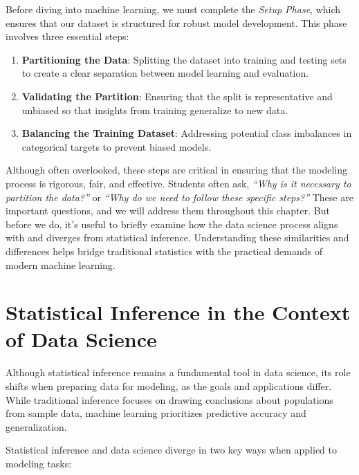 \documentclass[
]{book}
\providecommand{\tightlist}{%
  \setlength{\itemsep}{0pt}\setlength{\parskip}{0pt}}
\theoremstyle{definition}
\theoremstyle{definition}
\theoremstyle{definition}
\theoremstyle{definition}
\theoremstyle{remark}
\begin{document}
Before diving into machine learning, we must complete the \emph{Setup Phase}, which ensures that our dataset is structured for robust model development. This phase involves three essential steps:

\begin{enumerate}
\def\labelenumi{\arabic{enumi}.}
\tightlist
\item
  \textbf{Partitioning the Data}: Splitting the dataset into training and testing sets to create a clear separation between model learning and evaluation.\\
\item
  \textbf{Validating the Partition}: Ensuring that the split is representative and unbiased so that insights from training generalize to new data.\\
\item
  \textbf{Balancing the Training Dataset}: Addressing potential class imbalances in categorical targets to prevent biased models.
\end{enumerate}

Although often overlooked, these steps are critical in ensuring that the modeling process is rigorous, fair, and effective. Students often ask, \emph{``Why is it necessary to partition the data?''} or \emph{``Why do we need to follow these specific steps?''} These are important questions, and we will address them throughout this chapter. But before we do, it's useful to briefly examine how the data science process aligns with and diverges from statistical inference. Understanding these similarities and differences helps bridge traditional statistics with the practical demands of modern machine learning.

\section{Statistical Inference in the Context of Data Science}\label{statistical-inference-in-the-context-of-data-science}

Although statistical inference remains a fundamental tool in data science, its role shifts when preparing data for modeling, as the goals and applications differ. While traditional inference focuses on drawing conclusions about populations from sample data, machine learning prioritizes predictive accuracy and generalization.

Statistical inference and data science diverge in two key ways when applied to modeling tasks:
\end{document}
